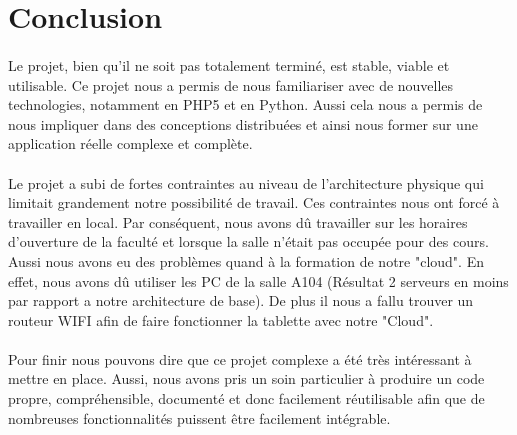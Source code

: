 \documentclass[a4paper,12pt]{article}
\begin{document}
\newpage

\section{Conclusion}
\paragraph*{}

Le projet, bien qu'il ne soit pas totalement terminé, est stable, viable et utilisable. Ce projet nous a permis de nous familiariser avec de nouvelles technologies, notamment en PHP5 et en Python. Aussi cela nous a permis de nous impliquer dans des conceptions distribuées et ainsi nous former sur une application réelle complexe et complète.

\paragraph*{}
Le projet a subi de fortes contraintes au niveau de l'architecture physique qui limitait grandement notre possibilité de travail. Ces contraintes nous ont forcé à travailler en local. Par conséquent, nous avons dû travailler sur les horaires d'ouverture de la faculté et lorsque la salle n'était pas occupée pour des cours. Aussi nous avons eu des problèmes quand à la formation de notre "cloud". En effet, nous avons dû utiliser les PC de la salle A104 (Résultat 2 serveurs en moins par rapport a notre architecture de base). De plus il nous a fallu trouver un routeur WIFI afin de faire fonctionner la tablette avec notre "Cloud".

\paragraph*{}
Pour finir nous pouvons dire que ce projet complexe a été très intéressant à mettre en place. Aussi, nous avons pris un soin particulier à produire un code propre, compréhensible, documenté et donc facilement réutilisable afin que de nombreuses fonctionnalités puissent être facilement intégrable. 


\newpage
\listoffigures
\end{document}
